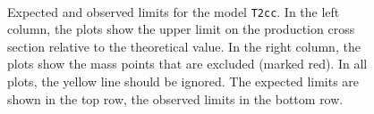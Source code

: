 \begin{figure}[h!]
  \begin{center}
     \quad 
     \\
    \caption{\label{fig:limits-t2cc-obs} Expected and observed limits
      for the model \texttt{T2cc}. In the left column, the plots show
      the upper limit on the production cross section relative to the 
      theoretical value. In the right column, the plots show the mass
      points that are excluded (marked red). In all plots, the yellow
      line should be ignored. The expected limits are shown in the
      top row, the observed limits in the bottom row. }
  \end{center}
\end{figure}

